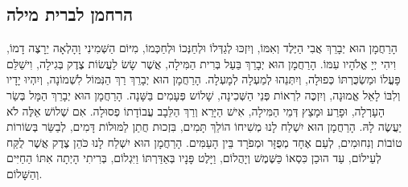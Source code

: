 \documentclass[11pt,twoside]{article}
\begin{document}
\subsection*{הרחמן לברית מילה}\label{sec:bris}
{%
\setlength{\leftskip}{0pt plus -0.5fil}%
\setlength{\rightskip}{0pt plus 0.5fil}%

הָרַחֲמָן הוּא יְבָרֵךְ אֲבִי הַיֶּלֶד וְאִמּוֹ, וְיִזְכּוּ לְגַדְּלוֹ וּלְחַנְּכוֹ וּלְחַכְּמוֹ, מִיּוֹם הַשְּׁמִינִי
וָהָלְאָה יֵרָצֶה דָמוֹ, וִיהִי יְיָ אֱלֹהָיו עִמּוֹ.
\vfill%
הָרַחֲמָן הוּא יְבָרֵךְ בַּעַל בְּרִית הַמִּילָה, אֲשֶׁר שָׂשׂ לַעֲשׂוֹת צֶדֶק בְּגִילָה, וִישַׁלֵּם פָּעֳלוֹ
וּמַשְׂכֻּרְתּוֹ כְּפוּלָה, וְיִתְּנֵהוּ לְמַעְלָה לְמָעְלָה.
\vfill%
הָרַחֲמָן הוּא יְבָרֵךְ רַךְ הַנִּמּוֹל לִשְׁמוֹנָה, וְיִהְיוּ יָדָיו וְלִבּוֹ לָאֵל אֱמוּנָה, וְיִזְכֶּה לִרְאוֹת
פְּנֵי הַשְּׁכִינָה, שָׁלוֹש פְּעָמִים בַּשָּׁנָה.
\vfill%
הָרַחֲמָן הוּא יְבָרֵךְ הַמָּל בְּשַׂר הָעָרְלָה, וּפָרַע וּמָצַץ דְּמֵי הַמִּילָה, אִישׁ הַיָּרֵא וְרַךְ הַלֵּבָב
עֲבוֹדָתוֹ פְסוּלָה. אִם שְׁלוֹשׁ אֵלֶּה לֹא יַעֲשֶׂה לָהּ.
\vfill%
הָרַחֲמָן הוּא יִשְׁלַח לָנוּ מְשִׁיחוֹ הוֹלֵךְ תָּמִים, בִּזְכוּת חֲתַן לַמּוּלוֹת דָּמִים, לְבַשֵּׂר בְּשׂוֹרוֹת
טוֹבוֹת וְנִחוּמִים, לְעַם אֶחָד מְפֻזָּר וּמְפֹרָד בֵּין הָעַמִּים.
\vfill%
הָרַחֲמָן הוּא יִשְׁלַח לָנוּ כֹּהֵן צֶדֶק אֲשֶׁר לֻקַּח לְעֵילוֹם, עַד הוּכַן כִּסְאוֹ כַּשֶּׁמֶשׁ וְיָהֲלוֹם,
וַיָּלֶט פָּנָיו בְּאַדַּרְתּוֹ וַיִּגְלוֹם, בְּרִיתִי הָיְתָה אִתּוֹ הַחַיִּים וְהַשָּׁלוֹם.\par
}

\newpage
\end{document}
